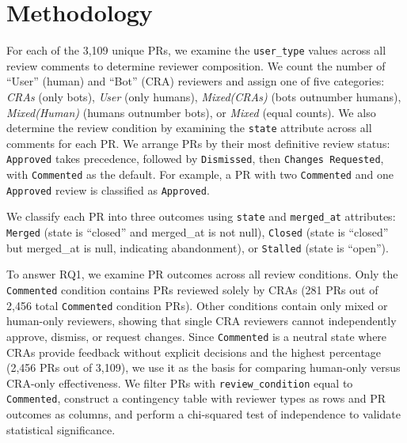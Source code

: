 \documentclass[sigconf]{acmart}
\begin{document}
\section{Methodology}

For each of the 3,109 unique PRs, we examine the \texttt{user\_type} values across all review comments to determine reviewer composition. We count the number of ``User'' (human) and ``Bot'' (CRA) reviewers and assign one of five categories: \textit{CRAs} (only bots), \textit{User} (only humans), \textit{Mixed(CRAs)} (bots outnumber humans), \textit{Mixed(Human)} (humans outnumber bots), or \textit{Mixed} (equal counts). We also determine the review condition by examining the \texttt{state} attribute across all comments for each PR. We arrange PRs by their most definitive review status: \texttt{Approved} takes precedence, followed by \texttt{Dismissed}, then \texttt{Changes Requested}, with \texttt{Commented} as the default. For example, a PR with two \texttt{Commented} and one \texttt{Approved} review is classified as \texttt{Approved}.


We classify each PR into three outcomes using \texttt{state} and \texttt{merged\_at} attributes: \texttt{Merged} (state is ``closed'' and merged\_at is not null), \texttt{Closed} (state is ``closed'' but merged\_at is null, indicating abandonment), or \texttt{Stalled} (state is ``open'').

To answer RQ1, we examine PR outcomes across all review conditions. Only the \texttt{Commented} condition contains PRs reviewed solely by CRAs (281 PRs out of 2,456 total \texttt{Commented} condition PRs). Other conditions contain only mixed or human-only reviewers, showing that single CRA reviewers cannot independently approve, dismiss, or request changes. Since \texttt{Commented} is a neutral state where CRAs provide feedback without explicit decisions and the highest percentage (2,456 PRs out of 3,109), we use it as the basis for comparing human-only versus CRA-only effectiveness. We filter PRs with \texttt{review\_condition} equal to \texttt{Commented}, construct a contingency table with reviewer types as rows and PR outcomes as columns, and perform a chi-squared test of independence to validate statistical significance.

\end{document}
